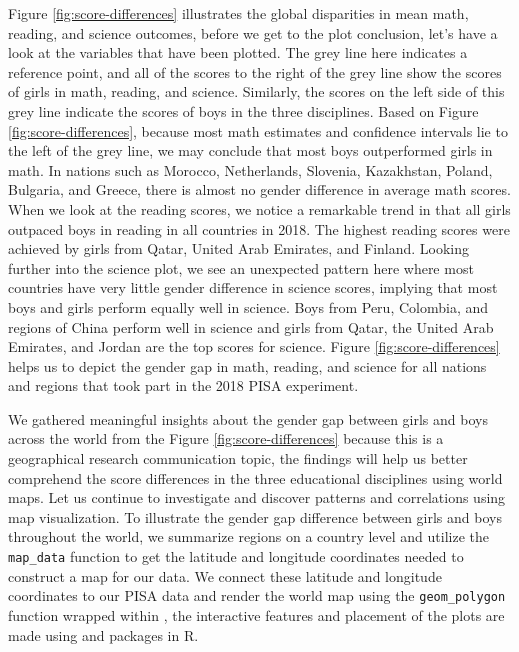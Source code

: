 Figure \ref{fig:score-differences} illustrates the global disparities in mean math, reading, and science outcomes, before we get to the plot conclusion, let's have a look at the variables that have been plotted. The grey line here indicates a reference point, and all of the scores to the right of the grey line show the scores of girls in math, reading, and science. Similarly, the scores on the left side of this grey line indicate the scores of boys in the three disciplines. Based on Figure \ref{fig:score-differences}, because most math estimates and confidence intervals lie to the left of the grey line, we may conclude that most boys outperformed girls in math. In nations such as Morocco, Netherlands, Slovenia, Kazakhstan, Poland, Bulgaria, and Greece, there is almost no gender difference in average math scores. When we look at the reading scores, we notice a remarkable trend in that all girls outpaced boys in reading in all countries in 2018. The highest reading scores were achieved by girls from Qatar, United Arab Emirates, and Finland. Looking further into the science plot, we see an unexpected pattern here where most countries have very little gender difference in science scores, implying that most boys and girls perform equally well in science. Boys from Peru, Colombia, and regions of China perform well in science and girls from Qatar, the United Arab Emirates, and Jordan are the top scores for science. Figure \ref{fig:score-differences} helps us to depict the gender gap in math, reading, and science for all nations and regions that took part in the 2018 PISA experiment.

We gathered meaningful insights about the gender gap between girls and boys across the world from the Figure \ref{fig:score-differences} because this is a geographical research communication topic, the findings will help us better comprehend the score differences in the three educational disciplines using world maps. Let us continue to investigate and discover patterns and correlations using map visualization. To illustrate the gender gap difference between girls and boys throughout the world, we summarize regions on a country level and utilize the \texttt{map\_data} function to get the latitude and longitude coordinates needed to construct a map for our data. We connect these latitude and longitude coordinates to our PISA data and render the world map using the \texttt{geom\_polygon} function wrapped within  \citep{ggplot2}, the interactive features and placement of the plots are made using  \citep{plotly} and  \citep{patchwork} packages in R.


